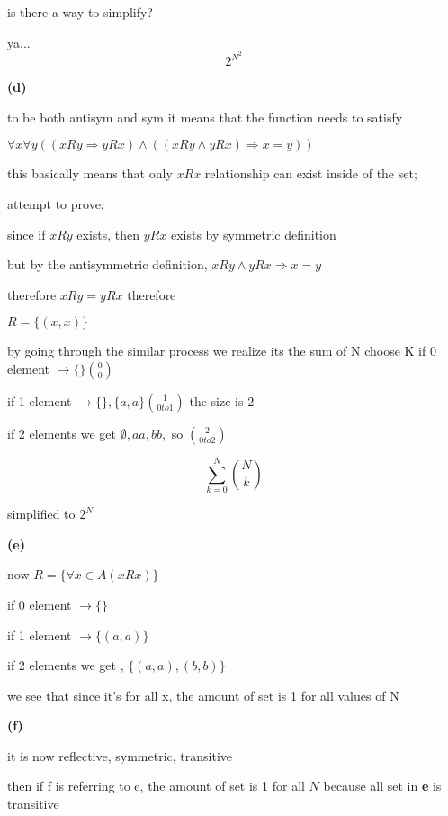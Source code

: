 \documentclass[12pts,A4]{article}
\begin{document}
\begin{flushleft}
    is there a way to simplify?

    ya... $$ 2^{N^2} $$



    \textbf{(d)}
    
    to be both antisym and sym it means that the function needs to satisfy

    $ \forall x \forall y ((xRy \Rightarrow yRx) \wedge ((xRy \wedge yRx) \Rightarrow x = y ))$ 

    this basically means that only $xRx$ relationship can exist inside of the set;
    
    attempt to prove:

    since if $xRy$ exists, then $yRx$ exists by symmetric definition
    
    but by the antisymmetric definition, $xRy \wedge yRx \Rightarrow  x = y$

    therefore $xRy = yRx$ therefore

    $ R = \{(x,x)\} $

    \bigskip

    by going through the similar process we realize its the sum of N choose K
    if 0 element $\rightarrow \{\} \binom{0}{0}$

    if 1 element $\rightarrow \{\} , \{a,a\} \binom{1} {0 to 1} $ the size is 2

    if 2 elements we get $ \emptyset , aa ,  bb, $ so $ \binom{2} {0 to 2} $ 

    $$\sum_{k=0}^{N} \binom{N} {k} $$ 
   
    simplified to $ 2 ^{N}$
    
    \bigskip

    \textbf{(e)}
    
    now $ R = \{  \forall x \in A ( xRx ) \} $ 

    if 0 element $\rightarrow \{\}$

    if 1 element $\rightarrow  \{(a,a)\}$ 

    if 2 elements we get , $\{ (a,a),(b,b) \}$

    we see that since it's for all x, the amount of set is 1 for all values of N 

   \bigskip

   \pagebreak

    \textbf{(f)}
    

    it is now reflective, symmetric, transitive
    
    then if f is referring to e, the amount of set is 1 for all $N$ because all set in \textbf{e} is transitive


\end{flushleft}
\end{document}
